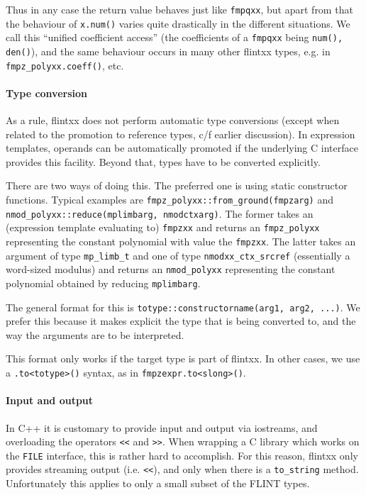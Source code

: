 \documentclass[a4paper,10pt]{book}
\newcommand{\code}{\lstinline}
\begin{document}
{{Thus in any case the return value behaves just like \code{fmpqxx}, but apart
from that the behaviour of \code{x.num()} varies quite drastically in the
different situations. We call this ``unified coefficient access'' (the
coefficients of a \code{fmpqxx} being \code{num(), den()}), and the same
behaviour occurs in many other flintxx types, e.g. in
\code{fmpz_polyxx.coeff()}, etc.

\paragraph{Type conversion}

As a rule, flintxx does not perform automatic type conversions (except when
related to the promotion to reference types, c/f earlier discussion). In
expression templates, operands can be automatically promoted if the underlying
C interface provides this facility. Beyond that, types have to be converted
explicitly.

There are two ways of doing this. The preferred one is using static constructor
functions. Typical examples are
\code{fmpz_polyxx::from_ground(fmpzarg)} and\\
\code{nmod_polyxx::reduce(mplimbarg, nmodctxarg)}. The former takes an
(expression template evaluating to) \code{fmpzxx} and returns an
\code{fmpz_polyxx} representing the constant polynomial with value the
\code{fmpzxx}. The latter takes an argument of type \code{mp_limb_t} and one of
type \code{nmodxx_ctx_srcref} (essentially a word-sized modulus) and returns an
\code{nmod_polyxx} representing the constant polynomial obtained by reducing
\code{mplimbarg}.

The general format for this is \code{totype::constructorname(arg1, arg2, ...)}.
We prefer this because it makes explicit the type that is being converted to,
and the way the arguments are to be interpreted.

This format only works if the target type is part of flintxx. In other cases, we
use a \code{.to<totype>()} syntax, as in \code{fmpzexpr.to<slong>()}.

\paragraph{Input and output}

In C++ it is customary to provide input and output via iostreams, and
overloading the operators \code{<<} and \code{>>}. When wrapping a C library
which works on the \code{FILE} interface, this is rather hard to accomplish. For
this reason, flintxx only provides streaming output (i.e. \code{<<}), and only
when there is a \code{to_string} method. Unfortunately this applies to only a
small subset of the FLINT types.

}}
\end{document}

